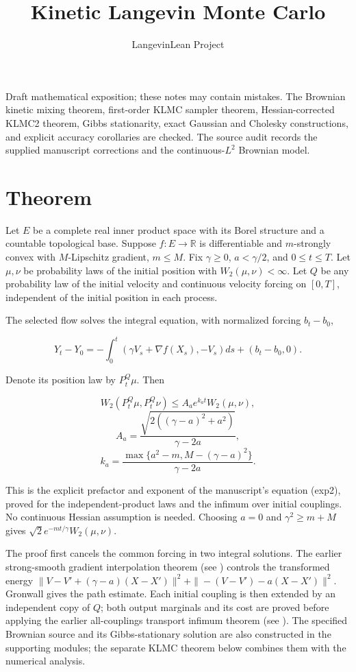 \documentclass[11pt,a4paper]{article}
\title{\texorpdfstring{Kinetic Langevin Monte Carlo}{Kinetic Langevin Monte Carlo}}
\author{LangevinLean Project}
\date{}
\begin{document}
\maketitle
Draft mathematical exposition; these notes may contain mistakes.
The Brownian kinetic mixing theorem, first-order KLMC sampler theorem, Hessian-corrected KLMC2 theorem, Gibbs stationarity, exact Gaussian and Cholesky constructions, and explicit accuracy corollaries are checked. The source audit records the supplied manuscript corrections and the continuous-\(L^2\) Brownian model.
\section{\texorpdfstring{Theorem}{Theorem}}


Let \(E\) be a complete real inner product space with its Borel
structure and a countable topological base. Suppose \(f:E\to\mathbb R\) is
differentiable and \(m\)-strongly convex with \(M\)-Lipschitz gradient,
\(m\le M\). Fix \(\gamma\ge0\), \(a<\gamma/2\), and \(0\le t\le T\).
Let \(\mu,\nu\) be probability laws of the initial position with
\(W_2(\mu,\nu)<\infty\). Let \(Q\) be any probability law of the initial
velocity and continuous velocity forcing on \([0,T]\), independent of the
initial position in each process.




The selected flow solves the integral equation, with normalized
forcing \(b_t-b_0\),


\[Y_t-Y_0=-\int_0^t(\gamma V_s+\nabla f(X_s),-V_s)ds+(b_t-b_0,0).\]


Denote its position law by \(P_t^Q\mu\). Then


\[\boxed{W_2(P_t^Q\mu,P_t^Q\nu)\le A_a e^{k_at}W_2(\mu,\nu),}\]
\[A_a=\frac{\sqrt{2((\gamma-a)^2+a^2)}}{\gamma-2a},\]
\[k_a=\frac{\max\{a^2-m,M-(\gamma-a)^2\}}{\gamma-2a}.\]


This is the explicit prefactor and exponent of the manuscript's equation
(exp2), proved for the independent-product laws and the infimum over
initial couplings. No continuous Hessian assumption is needed. Choosing
\(a=0\) and \(\gamma^2\ge m+M\) gives
\(\sqrt2e^{-mt/\gamma}W_2(\mu,\nu)\).




The proof first cancels the common forcing in two integral solutions.
The earlier strong-smooth gradient interpolation theorem (see \cite[Section~3.10.2]{LangevinLean2026ULASC}) controls the transformed energy
\(\|V-V'+(\gamma-a)(X-X')\|^2+\|-(V-V')-a(X-X')\|^2\).
Gronwall gives the path estimate. Each initial coupling is then extended by
an independent copy of \(Q\); both output marginals and its cost are proved
before applying the earlier all-couplings transport infimum theorem (see \cite[Section~3.18.4]{LangevinLean2026ULASC}). The specified Brownian source and
its Gibbs-stationary solution are also constructed in the supporting modules;
the separate KLMC theorem below combines them with the numerical analysis.
\end{document}
